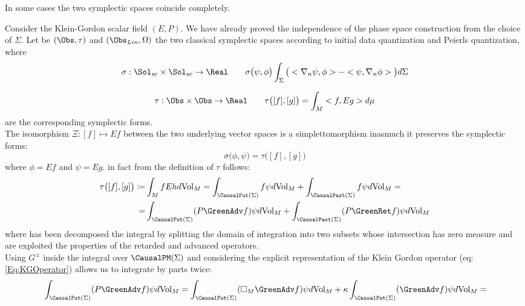 \documentclass[Main]{subfiles}
\begin{document}
	In some cases the two symplectic spaces coincide completely.	
		\begin{example}
		Consider the Klein-Gordon scalar field $(E,P)$.
		We have already proved the independence of the phase space construction from the choice of $\Sigma$.
		Let be $(\Obs,\tau)$ and $(\Obs_{Lin},\Omega)$ the two classical symplectic spaces according to initial data quantization and Peierls quantization, where
		\begin{displaymath}
			\sigma: \Sol_{sc}\times \Sol_{sc} \rightarrow \Real \qquad 
			\sigma\big( \psi, \phi \big) \int_\Sigma \big( <\nabla_n \psi ,\phi>  - <\psi, \nabla_n \phi> \big) d\Sigma
		\end{displaymath}
		
		\begin{displaymath}
			\tau: \Obs \times \Obs \rightarrow \Real \qquad
			\tau \big( [f] ,[g] \big) = \int_M < f, Eg> d\mu
		\end{displaymath}
		are the corresponding symplectic forms.\\
		The isomorphism $\Xi: [f] \mapsto E f$ between the two underlying vector spaces is a simplettomorphism 
		inasmuch it preserves the symplectic forms:
		\begin{displaymath}
			\sigma \big( \phi, \psi \big) =  \tau\big( [f], [g] \big)
		\end{displaymath}
		where $\phi = E f$ and $\psi= E g$.
		in fact from the definition of $\tau$ follows:
		\begin{align}
		\tau\big( [f], [g] \big) \coloneqq  & \int_M f E h d\textrm{Vol}_M = 
		\int_{\CausalFut(\Sigma)} f \psi d\textrm{Vol}_M	 + \int_{\CausalPast(\Sigma)} f \psi d\textrm{Vol}_M =	\nonumber \\
		=& \int_{\CausalFut(\Sigma)} (P \GreenAdv f) \psi d\textrm{Vol}_M	 + \int_{\CausalPast(\Sigma)} ( P \GreenRet f ) \psi d\textrm{Vol}_M
		\end{align}
		where has been decomposed the integral by splitting the domain of integration into two subsets whose intersection has zero measure and are exploited the properties of the retarded and advanced operators.\\
		Using $G^\pm$ inside the integral over $\CausalPM(\Sigma)$ and considering the explicit representation of the Klein Gordon operator (eq:\ref{Eq:KGOperator}) allows us to integrate by parts twice:
		\begin{align}
			&\int_{\CausalFut(\Sigma)} (P \GreenAdv f) \psi d\textrm{Vol}_M	=
			\int_{\CausalFut(\Sigma)} (\square_M \GreenAdv f) \psi d\textrm{Vol}_M	 + \kappa \int_{\CausalFut(\Sigma)} ( \GreenAdv f) \psi d\textrm{Vol}_M  = \nonumber\\

\end{align}
\end{example}
\end{document}
